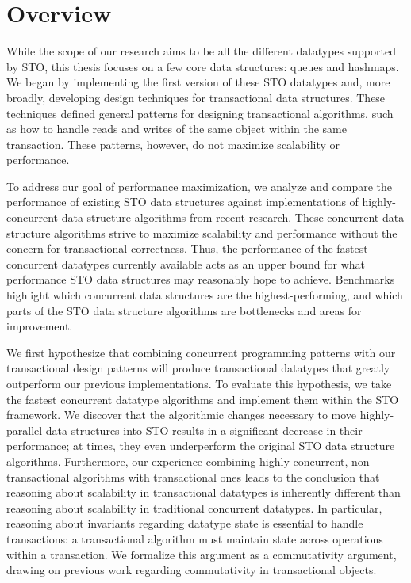 \section{Overview}
While the scope of our research aims to be all the different datatypes supported by STO, this thesis focuses on a few core data structures: queues and hashmaps. We began by implementing the first version of these STO datatypes and, more broadly, developing design techniques for transactional data structures. These techniques defined general patterns for designing transactional algorithms, such as how to handle reads and writes of the same object within the same transaction. These patterns, however, do not maximize scalability or performance.

To address our goal of performance maximization, we analyze and compare the performance of existing STO data structures against implementations of highly-concurrent data structure algorithms from recent research. These concurrent data structure algorithms strive to maximize scalability and performance without the concern for transactional correctness. Thus, the performance of the fastest concurrent datatypes currently available acts as an upper bound for what performance STO data structures may reasonably hope to achieve. Benchmarks highlight which concurrent data structures are the highest-performing, and which parts of the STO data structure algorithms are bottlenecks and areas for improvement. 

We first hypothesize that combining concurrent programming patterns with our transactional design patterns will produce transactional datatypes that greatly outperform our previous implementations. To evaluate this hypothesis, we take the fastest concurrent datatype algorithms and implement them within the STO framework. We discover that the algorithmic changes necessary to move highly-parallel data structures into STO results in a significant decrease in their performance; at times, they even underperform the original STO data structure algorithms. Furthermore, our experience combining highly-concurrent, non-transactional algorithms with transactional ones leads to the conclusion that reasoning about scalability in transactional datatypes is inherently different than reasoning about scalability in traditional concurrent datatypes. In particular, reasoning about invariants regarding datatype state is essential to handle transactions: a transactional algorithm must maintain state across operations within a transaction. We formalize this argument as a commutativity argument, drawing on previous work regarding commutativity in transactional objects\cite{weihl}.

